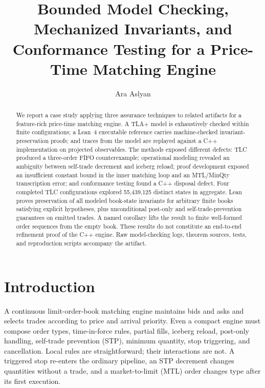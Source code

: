 \documentclass[runningheads]{llncs}
\title{Bounded Model Checking, Mechanized Invariants, and Conformance Testing for a Price-Time Matching Engine}
\author{Ara Aslyan}
\institute{Strike Technologies, New York, NY, USA\\
\email{aaslyan@striketechnologies.com}}
\begin{document}
\maketitle

\begin{abstract}
We report a case study applying three assurance techniques to related
artifacts for a feature-rich price-time matching engine. A TLA+ model is
exhaustively checked within finite configurations; a Lean~4 executable
reference carries machine-checked invariant-preservation proofs; and traces
from the model are replayed against a C++ implementation on projected
observables. The methods exposed different defects: TLC produced a
three-order FIFO counterexample; operational modeling revealed an ambiguity
between self-trade decrement and iceberg reload; proof development exposed an
insufficient constant bound in the inner matching loop and an MTL/MinQty
transcription error; and conformance testing found a C++ disposal defect.
Four completed TLC configurations explored 55,439,125 distinct states in
aggregate. Lean proves preservation of all modeled book-state invariants for
arbitrary finite books satisfying explicit hypotheses, plus unconditional
post-only and self-trade-prevention guarantees on emitted trades. A named
corollary lifts the result to finite well-formed order sequences from the
empty book. These results do not constitute an end-to-end refinement proof of
the C++ engine. Raw model-checking logs, theorem sources, tests, and
reproduction scripts accompany the artifact.

\end{abstract}

\section{Introduction}

A continuous limit-order-book matching engine maintains bids and asks and
selects trades according to price and arrival priority. Even a compact engine
must compose order types, time-in-force rules, partial fills, iceberg reload,
post-only handling, self-trade prevention (STP), minimum quantity, stop
triggering, and cancellation. Local rules are straightforward; their
interactions are not. A triggered stop re-enters the ordinary pipeline, an
STP decrement changes quantities without a trade, and a market-to-limit (MTL)
order changes type after its first execution.
\end{document}
